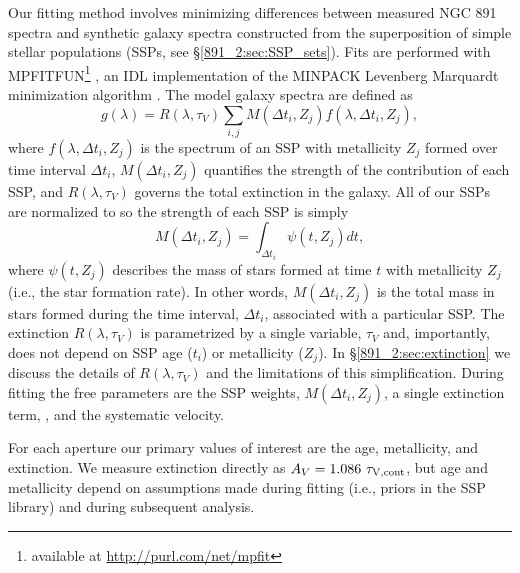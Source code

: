 Our fitting method involves minimizing differences between measured
NGC 891 spectra and synthetic galaxy spectra constructed from the
superposition of simple stellar populations (SSPs, see
\S\ref{891_2:sec:SSP_sets}). Fits are performed with
MPFITFUN\footnote{available at \url{http://purl.com/net/mpfit}}
\citep{Markwardt09}, an IDL implementation of the MINPACK Levenberg
Marquardt minimization algorithm \citep{More78}. The model galaxy
spectra are defined as
\begin{equation}
\label{891_2:eq:SSP_galaxy}
g(\lambda) = R(\lambda,\tau_V) \sum_{i,j} M(\Delta t_i,Z_j)
f(\lambda,\Delta t_i, Z_j),
\end{equation}
where $f(\lambda, \Delta t_i, Z_j)$ is the spectrum of an SSP with
metallicity $Z_j$ formed over time interval $\Delta t_i$, $M(\Delta
t_i,Z_j)$ quantifies the strength of the contribution of each SSP, and
$R(\lambda, \tau_V)$ governs the total extinction in the galaxy. All of our
SSPs are normalized to  so the strength of each SSP is
simply
\begin{equation}
\label{891_2:eq:fit_weight}
M(\Delta t_i,Z_j) = \int_{\Delta t_i} \psi(t, Z_j) dt,
\end{equation}
where $\psi(t, Z_j)$ describes the mass of stars formed at time $t$
with metallicity $Z_j$ (i.e., the star formation rate). In other
words, $M(\Delta t_i,Z_j)$ is the total mass in stars formed during
the time interval, $\Delta t_i$, associated with a particular SSP. The
extinction $R(\lambda, \tau_V)$ is parametrized by a single variable,
$\tau_V$ and, importantly, does not depend on SSP age ($t_i$) or
metallicity ($Z_j$). In \S\ref{891_2:sec:extinction} we discuss the details
of $R(\lambda, \tau_V)$ and the limitations of this
simplification. During fitting the free parameters are the SSP
weights, $M(\Delta t_i,Z_j)$, a single extinction term, \tauV, and the
systematic velocity.


For each aperture our primary values of interest are the age,
metallicity, and extinction. We measure extinction directly as $A_V =
1.086\ \tau_{\mathrm{V,cont}}$, but age and metallicity depend on assumptions made
during fitting (i.e., priors in the SSP library) and during subsequent
analysis.

